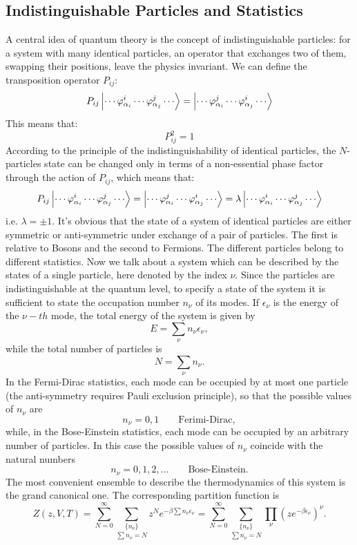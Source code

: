\documentclass[10pt]{article}
\begin{document}
	\subsection{Indistinguishable Particles and Statistics}
	A central idea of quantum theory is the concept of indistinguishable particles: for a system with many identical particles, an operator that exchanges two of them, swapping their positions, leave the physics invariant. We can define the transposition operator $P_{ij}$:
	$$P_{ij}\ket{\cdots\varphi_{\alpha_i}^i\cdots\varphi_{\alpha_j}^{j}\cdots}=\ket{\cdots\varphi_{\alpha_i}^j\cdots\varphi_{\alpha_j}^i\cdots}$$
	This means that:
	$$P_{ij}^2=1$$
	According to the principle of the indistinguishability of identical particles, the $N$-particles state can be changed only in terms of a non-essential phase factor through the action of $P_{ij}$, which means that:
	$$P_{ij}\ket{\cdots\varphi_{\alpha_i}^i\cdots\varphi_{\alpha_j}^{j}\cdots}=\ket{\cdots\varphi_{\alpha_i}^j\cdots\varphi_{\alpha_j}^i\cdots}=\lambda\ket{\cdots\varphi_{\alpha_i}^i\cdots\varphi_{\alpha_j}^{j}\cdots}$$
	i.e. $\lambda=\pm 1$. It's obvious that the state of a system of identical particles are either symmetric or anti-symmetric under exchange of a pair of particles. The first is relative to Bosons and the second to Fermions. The different particles belong to different statistics. Now we talk about a system which can be described by the states of a single particle, here denoted by the index $\nu$. Since the particles are indistinguishable at the quantum level, to specify a state of the system it is sufficient to state the occupation number $n_\nu$ of its modes. If $\epsilon_\nu$ is the energy of the $\nu-th$ mode, the total energy of the system is given by 
	$$E=\sum_{\nu}n_\nu \epsilon_\nu,$$
	while the total number of particles is 
	$$N=\sum_\nu n_\nu.$$ 
	In the Fermi-Dirac statistics, each mode can be occupied by at most one particle (the anti-symmetry requires Pauli exclusion principle), so that the possible values of $n_\nu$ are 
	$$n_\nu=0,1\qquad \text{Ferimi-Dirac},$$
	while, in the Bose-Einstein statistics, each mode can be occupied by an arbitrary number of particles. In this case the possible values of $n_\nu$ coincide with the natural numbers 
	$$n_\nu=0,1,2,\text{…}\qquad \text{Bose-Einstein}.$$ 
	The most convenient ensemble to describe the thermodynamics of this system is the grand canonical one. The corresponding partition function is 
	$$Z(z,V,T)=\sum_{N=0}^\infty\underset{\sum n_\nu=N}{\sum_{\{n_\nu\}}} z^Ne^{-\beta\sum n_\nu\epsilon_\nu}=\sum_{N=0}^\infty\underset{\sum n_\nu=N}{\sum_{\{n_\nu\}}}\prod_\nu(ze^{-\beta\epsilon_\nu})^\nu.$$
\end{document}
